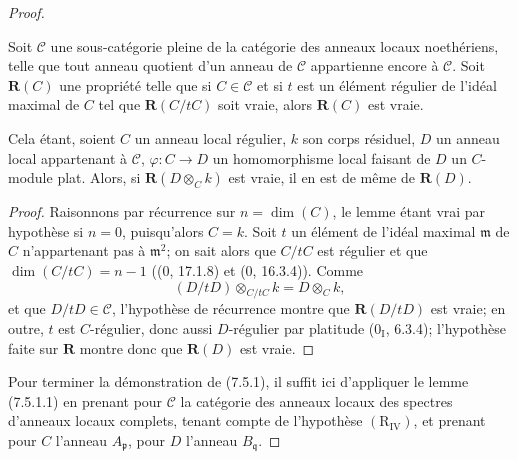 \begin{proof}

\begin{lemma}[7.5.1.1]
\label{IV.2.s7.5.1.1-fr}
Soit $\mathcal C$ une sous-catégorie pleine de la catégorie des anneaux
locaux noethériens, telle que tout anneau quotient d'un anneau de
$\mathcal C$ appartienne encore à $\mathcal C$. Soit $\boldsymbol R(C)$ une
propriété telle que si $C\in\mathcal C$ et si $t$ est un élément régulier de
l'idéal maximal de $C$ tel que $\boldsymbol R(C/tC)$ soit vraie, alors
$\boldsymbol R(C)$ est vraie.

Cela étant, soient $C$ un anneau local régulier, $k$ son corps résiduel,
$D$ un anneau local appartenant à $\mathcal C$,
$\varphi:C\to D$ un homomorphisme local faisant de $D$ un $C$-module plat.
Alors, si $\boldsymbol R(D\otimes_C k)$ est vraie, il en est de même de
$\boldsymbol R(D)$.
\end{lemma}

\begin{proof}
Raisonnons par récurrence sur $n=\dim(C)$, le lemme étant vrai par hypothèse
si $n=0$, puisqu'alors $C=k$. Soit $t$ un élément de l'idéal maximal
$\mathfrak m$ de $C$ n'appartenant pas à $\mathfrak m^2$; on sait alors que
$C/tC$ est régulier et que $\dim(C/tC)=n-1$ ((0, 17.1.8) et (0, 16.3.4)).
Comme
\[
(D/tD)\otimes_{C/tC}k=D\otimes_C k,
\]
et que $D/tD\in\mathcal C$, l'hypothèse de récurrence montre que
$\boldsymbol R(D/tD)$ est vraie; en outre, $t$ est $C$-régulier, donc aussi
$D$-régulier par platitude (0$_{\mathrm I}$, 6.3.4); l'hypothèse faite sur
$\boldsymbol R$ montre donc que $\boldsymbol R(D)$ est vraie.
\end{proof}

Pour terminer la démonstration de (7.5.1), il suffit ici d'appliquer le
lemme (7.5.1.1) en prenant pour $\mathcal C$ la catégorie des anneaux locaux
des spectres d'anneaux locaux complets, tenant compte de l'hypothèse
$(\mathrm R_{\mathrm{IV}})$, et prenant pour $C$ l'anneau
$A_{\mathfrak p}$, pour $D$ l'anneau $B_{\mathfrak q}$.
\end{proof}

